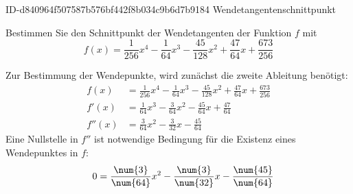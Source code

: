 \begin{exercise}
      {ID-d840964f507587b576bf442f8b034c9b6d7b9184}
      {Wendetangentenschnittpunkt}
  \ifproblem\problem\par
    Bestimmen Sie den Schnittpunkt der Wendetangenten der
    Funktion $f$ mit
    \begin{equation*}
      f(x)=\frac{\num{1}}{\num{256}}x^{4}-\frac{\num{1}}{\num{64}}x^{3}-\frac{\num{45}}{\num{128}}x^{2}+\frac{\num{47}}{\num{64}}x+\frac{\num{673}}{\num{256}}
    \end{equation*}
  \fi
  \ifoutcome\outcome\par
    Zur Bestimmung der Wendepunkte, wird zunächst
    die zweite Ableitung benötigt:
    \begin{equation*}
      \begin{split}
      f(x)&=\frac{\num{1}}{\num{256}}x^{4}-\frac{\num{1}}{\num{64}}x^{3}-\frac{\num{45}}{\num{128}}x^{2}+\frac{\num{47}}{\num{64}}x+\frac{\num{673}}{\num{256}}\\[2ex]
      f'(x)&=\frac{\num{1}}{\num{64}}x^{3}-\frac{\num{3}}{\num{64}}x^{2}-\frac{\num{45}}{\num{64}}x+\frac{\num{47}}{\num{64}}\\[2ex]
      f''(x)&=\frac{\num{3}}{\num{64}}x^{2}-\frac{\num{3}}{\num{32}}x-\frac{\num{45}}{\num{64}}
      \end{split}
    \end{equation*}
    Eine Nullstelle in $f''$ ist notwendige Bedingung
    für die Existenz eines Wendepunktes in $f$:
    \begin{alignat*}{3}
      \relax&\quad
      &
      0&=\frac{\num{3}}{\num{64}}x^{2}-\frac{\num{3}}{\num{32}}x-\frac{\num{45}}{\num{64}}

\end{alignat*}
\end{exercise}
